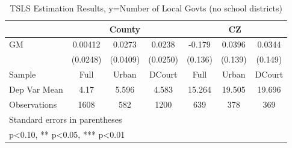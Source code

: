 \begin{table}[htbp]\centering
\def\sym#1{\ifmmode^{#1}\else\(^{#1}\)\fi}
\caption{TSLS Estimation Results, y=Number of Local Govts (no school districts)}
\begin{tabular}{l*{6}{c}}
\toprule
                &\multicolumn{3}{c}{County}            &\multicolumn{3}{c}{CZ}                \\\cmidrule(lr){2-4}\cmidrule(lr){5-7}
\midrule
GM              &  0.00412   &   0.0273   &   0.0238   &   -0.179   &   0.0396   &   0.0344   \\
                & (0.0248)   & (0.0409)   & (0.0250)   &  (0.136)   &  (0.139)   &  (0.149)   \\
\midrule
Sample          &     Full   &    Urban   &   DCourt   &     Full   &    Urban   &   DCourt   \\
Dep Var Mean    &     4.17   &    5.596   &    4.583   &   15.264   &   19.505   &   19.696   \\
Observations    &     1608   &      582   &     1200   &      639   &      378   &      369   \\
\bottomrule
\multicolumn{7}{l}{\footnotesize Standard errors in parentheses}\\
\multicolumn{7}{l}{\footnotesize * p<0.10, ** p<0.05, *** p<0.01}\\
\end{tabular}
\end{table}

